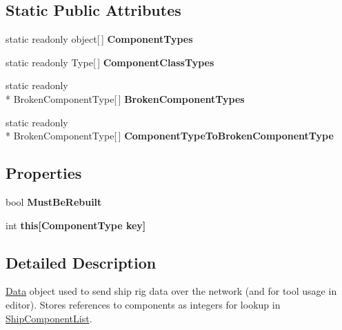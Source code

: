 \subsection*{Static Public Attributes}
\begin{DoxyCompactItemize}
\item 
static readonly object\mbox{[}$\,$\mbox{]} {\bfseries Component\-Types}
\item 
static readonly Type\mbox{[}$\,$\mbox{]} {\bfseries Component\-Class\-Types}
\item 
static readonly \\*
Broken\-Component\-Type\mbox{[}$\,$\mbox{]} {\bfseries Broken\-Component\-Types}
\item 
static readonly \\*
Broken\-Component\-Type\mbox{[}$\,$\mbox{]} {\bfseries Component\-Type\-To\-Broken\-Component\-Type}
\end{DoxyCompactItemize}
\subsection*{Properties}
\begin{DoxyCompactItemize}
\item 
\hypertarget{class_skyrates_1_1_ship_1_1_ship_data_a67b256cd80d009f33b78c55a5f03676f}{bool {\bfseries Must\-Be\-Rebuilt}}\label{class_skyrates_1_1_ship_1_1_ship_data_a67b256cd80d009f33b78c55a5f03676f}

\item 
\hypertarget{class_skyrates_1_1_ship_1_1_ship_data_a9c37e4eb2a873de1b886cdbd4fa7aa55}{int {\bfseries this\mbox{[}\-Component\-Type key\mbox{]}}}\label{class_skyrates_1_1_ship_1_1_ship_data_a9c37e4eb2a873de1b886cdbd4fa7aa55}

\end{DoxyCompactItemize}


\subsection{Detailed Description}
\hyperlink{namespace_skyrates_1_1_data}{Data} object used to send ship rig data over the network (and for tool usage in editor). Stores references to components as integers for lookup in \hyperlink{class_skyrates_1_1_ship_1_1_ship_component_list}{Ship\-Component\-List}. 



